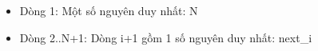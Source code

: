 \begin{itemize}
	\item     Dòng 1: Một số nguyên duy nhất: N   
	\item     Dòng 2..N+1: Dòng i+1 gồm 1 số nguyên duy nhất: next\_i   
\end{itemize}